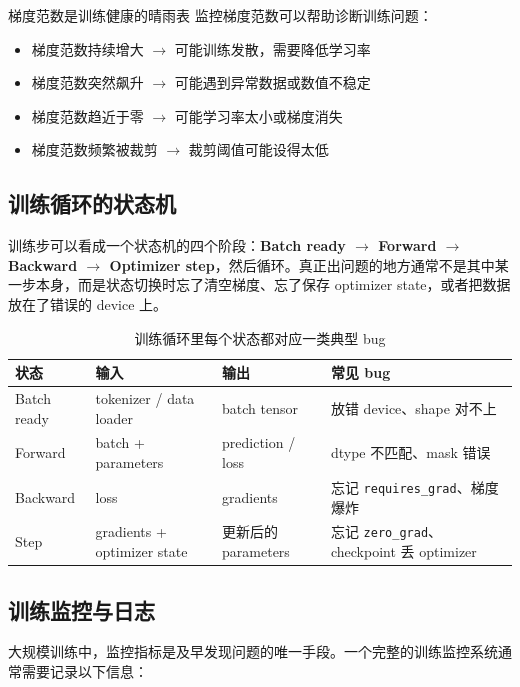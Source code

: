 \documentclass[a4paper]{article}
\begin{document}
\begin{importantbox}{梯度范数是训练健康的晴雨表}
监控梯度范数可以帮助诊断训练问题：
\begin{itemize}
    \item 梯度范数持续增大 $\to$ 可能训练发散，需要降低学习率
    \item 梯度范数突然飙升 $\to$ 可能遇到异常数据或数值不稳定
    \item 梯度范数趋近于零 $\to$ 可能学习率太小或梯度消失
    \item 梯度范数频繁被裁剪 $\to$ 裁剪阈值可能设得太低
\end{itemize}
\end{importantbox}

\subsection{训练循环的状态机}

训练步可以看成一个状态机的四个阶段：\textbf{Batch ready $\to$ Forward $\to$ Backward $\to$ Optimizer step}，然后循环。真正出问题的地方通常不是其中某一步本身，而是状态切换时忘了清空梯度、忘了保存 optimizer state，或者把数据放在了错误的 device 上。

\begin{table}[H]
\centering
\begin{tabular}{p{}p{}p{}p{}}
\toprule
\textbf{状态} & \textbf{输入} & \textbf{输出} & \textbf{常见 bug} \\
\midrule
Batch ready & tokenizer / data loader & batch tensor & 放错 device、shape 对不上 \\
Forward & batch + parameters & prediction / loss & dtype 不匹配、mask 错误 \\
    Backward & loss & gradients & 忘记 \texttt{requires\_grad}、梯度爆炸 \\
    Step & gradients + optimizer state & 更新后的 parameters & 忘记 \texttt{zero\_grad}、checkpoint 丢 optimizer \\
\bottomrule
\end{tabular}
\caption{训练循环里每个状态都对应一类典型 bug}
\end{table}

\subsection{训练监控与日志}

大规模训练中，监控指标是及早发现问题的唯一手段。一个完整的训练监控系统通常需要记录以下信息：
\end{document}
